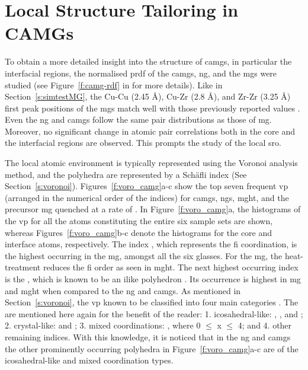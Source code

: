 \section{Local Structure Tailoring in CAMGs} \label{s:vorocamg}
\begin{changebar}
To obtain a more detailed insight into the structure of \gls{camg}s, in particular the interfacial regions, the normalised \gls{prdf} of the \gls{camg}s, \gls{ng}, and the \gls{mg}s were studied (see Figure~\ref{f:camg-rdf} in  for more details). Like in Section~\ref{s:simtestMG}, the Cu-Cu (2.45 \r{A}), Cu-Zr (2.8 \r{A}), and Zr-Zr (3.25 \r{A}) first peak positions of the \gls{mg}s match well with those previously reported values \cite{Nasu2007,Duan2005}. Even the \gls{ng} and \gls{camg}s follow the same pair distributions as those of \gls{mg}. Moreover, no significant change in atomic pair correlations both in the core and the interfacial regions are observed. This prompts the study of the local \gls{sro}. \par

The local atomic environment is typically represented using the Voronoi analysis method, and the polyhedra are represented by a   Sch\"afli index (See Section~\ref{s:voronoi}). Figures~\ref{f:voro_camg}a-c show the top seven frequent \gls{vp} (arranged in the numerical order of the indices) for \gls{camg}s, \gls{ng}s, \gls{mght}, and the precursor \gls{mg} quenched at a rate of . In Figure~\ref{f:voro_camg}a, the histograms of the \gls{vp} for all the atoms constituting the entire six sample sets are shown, whereas Figures~\ref{f:voro_camg}b-c denote the histograms for the core and interface atoms, respectively. The index , which represents the \gls{fi} coordination, is the highest occurring in the \gls{mg}, amongst all the six glasses. For the  \gls{mg}, the heat-treatment reduces the \gls{fi} order as seen in \gls{mght}. The next highest occurring index is the , which is known to be an \gls{ilike} polyhedron \cite{Yue2018,Borodin1999}. Its occurrence is highest in \gls{mg} and \gls{mght} when compared to the \gls{ng} and \gls{camg}s. As mentioned in Section~\ref{s:voronoi}, the \gls{vp} known to be classified into four main categories \cite{Yue2018}. The are mentioned here again for the benefit of the reader: 1. icosahedral-like: , , and ; 2. crystal-like:  and ; 3. mixed coordinations: , where 0 $\leq$ x $\leq$ 4; and 4. other remaining indices. With this knowledge, it is noticed that in the \gls{ng} and \gls{camg}s the other prominently occurring polyhedra in Figure~\ref{f:voro_camg}a-c are of the icosahedral-like and mixed coordination types. \par


\end{changebar}
